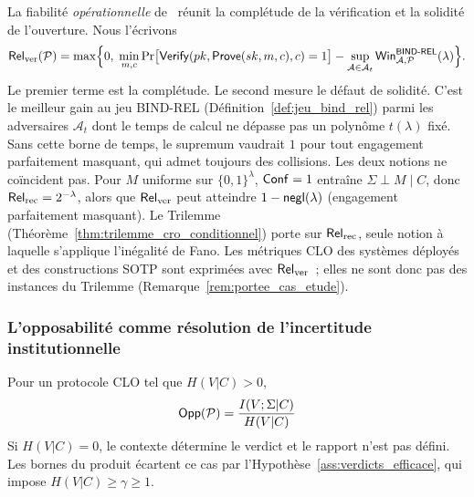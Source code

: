 \begin{sloppypar}
\begin{remark}\label{rem:rel_ver}
La fiabilit\'e \emph{op\'erationnelle} de~\cite{MINKA2026CLO} r\'eunit la
compl\'etude de la v\'erification et la solidit\'e de l'ouverture. Nous l'\'ecrivons
\begin{equation}
\mathsf{Rel}_{\mathrm{ver}}(\mathcal{P}) = \max\Bigl\{0,\;
  \min_{m,c}\Pr\bigl[\mathsf{Verify}(pk,\mathsf{Prove}(sk,m,c),c)=1\bigr]
  - \sup_{\mathcal{A} \in \mathcal{A}_t}\mathsf{Win}^{\mathsf{BIND\text{-}REL}}_{\mathcal{A},\mathcal{P}}(\lambda)\Bigr\}.
\label{eq:rel_ver}
\end{equation}
Le premier terme est la compl\'etude. Le second mesure le d\'efaut de solidit\'e. C'est le
meilleur gain au jeu BIND-REL (D\'efinition~\ref{def:jeu_bind_rel}) parmi les adversaires
$\mathcal{A}_t$ dont le temps de calcul ne d\'epasse pas un polyn\^ome $t(\lambda)$ fix\'e. Sans cette
borne de temps, le supremum vaudrait $1$ pour tout engagement parfaitement masquant, qui
admet toujours des collisions.
Les deux notions ne co\"incident pas. Pour $M$ uniforme sur $\{0,1\}^\lambda$,
$\mathsf{Conf} = 1$ entra\^ine $\Sigma \perp M \mid C$, donc $\mathsf{Rel}_{\mathrm{rec}} = 2^{-\lambda}$,
alors que $\mathsf{Rel}_{\mathrm{ver}}$ peut atteindre $1 - \mathsf{negl}(\lambda)$ (engagement parfaitement masquant). Le
Trilemme (Th\'eor\`eme~\ref{thm:trilemme_cro_conditionnel}) porte sur
$\mathsf{Rel}_{\mathrm{rec}}$, seule notion \`a laquelle s'applique l'in\'egalit\'e de Fano. Les
m\'etriques CLO des syst\`emes d\'eploy\'es et des constructions SOTP sont
exprim\'ees avec $\mathsf{Rel}_{\mathrm{ver}}$~; elles ne sont donc pas des instances du Trilemme
(Remarque~\ref{rem:portee_cas_etude}).
\end{remark}

\subsubsection{L'opposabilit\'e comme r\'esolution de l'incertitude institutionnelle}
\label{subsubsec:opposabilite_clo}

\begin{definition}[Opposabilit\'e]\label{def:opposabilite_clo}
Pour un protocole CLO tel que $H(V|C) > 0$,
\begin{equation}
\mathsf{Opp}(\mathcal{P}) = \frac{I(V;\Sigma|C)}{H(V|C)}
\label{eq:opp_clo}
\end{equation}
Si $H(V|C) = 0$, le contexte d\'etermine le verdict et le rapport n'est pas
d\'efini. Les bornes du produit \'ecartent ce cas par
l'Hypoth\`ese~\ref{ass:verdicts_efficace}, qui impose $H(V|C) \geq \gamma \geq 1$.
\end{definition}


\end{sloppypar}
